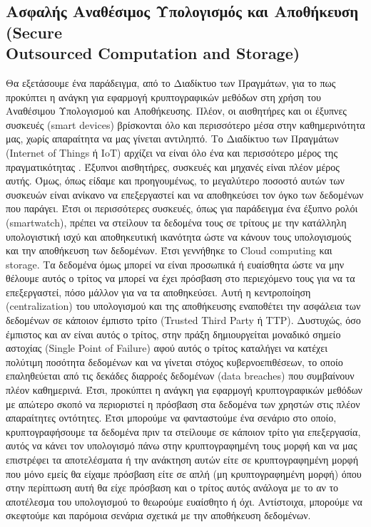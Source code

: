 \subsection[Ασφαλής Αναθέσιμος Υπολογισμός και Αποθήκευση (Secure Outsourced Computation and Storage)]{Ασφαλής Αναθέσιμος Υπολογισμός και Αποθήκευση (Secure \\ Outsourced Computation and Storage)}
Θα εξετάσουμε ένα παράδειγμα, από το Διαδίκτυο των Πραγμάτων, για το πως προκύπτει η ανάγκη για εφαρμογή κρυπτογραφικών μεθόδων στη χρήση του Αναθέσιμου Υπολογισμού και Αποθήκευσης. Πλέον, οι αισθητήρες και οι έξυπνες συσκευές (smart devices) βρίσκονται όλο και περισσότερο μέσα στην καθημερινότητα μας, χωρίς απαραίτητα να μας γίνεται αντιληπτό. Το Διαδίκτυο των Πραγμάτων (Internet of Things ή IoT) αρχίζει να είναι όλο ένα και περισσότερο μέρος της πραγματικότητας \cite{gershenfeld2004internet} \cite{li2015internet} . Έξυπνοι αισθητήρες, συσκευές και μηχανές είναι πλέον μέρος αυτής. Όμως, όπως είδαμε και προηγουμένως, το μεγαλύτερο ποσοστό αυτών των συσκευών είναι ανίκανο να επεξεργαστεί και να αποθηκεύσει τον όγκο των δεδομένων που παράγει. Έτσι οι περισσότερες συσκευές, όπως για παράδειγμα ένα έξυπνο ρολόι (smartwatch), πρέπει να στείλουν τα δεδομένα τους σε τρίτους με την κατάλληλη υπολογιστική ισχύ και αποθηκευτική ικανότητα ώστε να κάνουν τους υπολογισμούς και την αποθήκευση των δεδομένων. Έτσι γεννήθηκε το Cloud computing και storage. Τα δεδομένα όμως μπορεί να είναι προσωπικά ή ευαίσθητα ώστε να μην θέλουμε αυτός ο τρίτος να μπορεί να έχει πρόσβαση στο περιεχόμενο τους για να τα επεξεργαστεί, πόσο μάλλον για να τα αποθηκεύσει. Αυτή η κεντροποίηση (centralization) του υπολογισμού και της αποθήκευσης εναποθέτει την ασφάλεια των δεδομένων σε κάποιον έμπιστο τρίτο (Trusted Third Party ή TTP). Δυστυχώς, όσο έμπιστος και αν είναι αυτός ο τρίτος, στην πράξη δημιουργείται μοναδικό σημείο αστοχίας (Single Point of Failure) αφού αυτός ο τρίτος καταλήγει να κατέχει πολύτιμη ποσότητα δεδομένων και να γίνεται στόχος κυβερνοεπιθέσεων, το οποίο επαληθεύεται από τις δεκάδες διαρροές δεδομένων (data breaches) που συμβαίνουν πλέον καθημερινά. Έτσι, προκύπτει η ανάγκη για εφαρμογή κρυπτογραφικών μεθόδων με απώτερο σκοπό να περιοριστεί η πρόσβαση στα δεδομένα των χρηστών στις πλέον απαραίτητες οντότητες. Έτσι μπορούμε να φανταστούμε ένα σενάριο στο οποίο, κρυπτογραφήσουμε τα δεδομένα πριν τα στείλουμε σε κάποιον τρίτο για επεξεργασία, αυτός να κάνει τον υπολογισμό πάνω στην κρυπτογραφημένη τους μορφή και να μας επιστρέφει τα αποτελέσματα ή την ανάκτηση αυτών είτε σε κρυπτογραφημένη μορφή που μόνο εμείς θα είχαμε πρόσβαση είτε σε απλή (μη κρυπτογραφημένη μορφή) όπου στην περίπτωση αυτή θα είχε πρόσβαση και ο τρίτος αυτός ανάλογα με το αν το αποτέλεσμα του υπολογισμού το θεωρούμε ευαίσθητο ή όχι. Αντίστοιχα, μπορούμε να σκεφτούμε και παρόμοια σενάρια σχετικά με την αποθήκευση δεδομένων.

